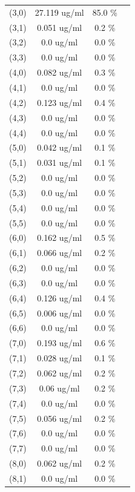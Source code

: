 \documentclass{article}
\begin{document}
\begin{tabular}{c c c c}
(3,0)&        27.119 ug/ml        &85.0 \%\\
(3,1)&        0.051 ug/ml        &0.2 \%\\
(3,2)&        0.0 ug/ml        &0.0 \%\\
(3,3)&        0.0 ug/ml        &0.0 \%\\
(4,0)&        0.082 ug/ml        &0.3 \%\\
(4,1)&        0.0 ug/ml        &0.0 \%\\
(4,2)&        0.123 ug/ml        &0.4 \%\\
(4,3)&        0.0 ug/ml        &0.0 \%\\
(4,4)&        0.0 ug/ml        &0.0 \%\\
(5,0)&        0.042 ug/ml        &0.1 \%\\
(5,1)&        0.031 ug/ml        &0.1 \%\\
(5,2)&        0.0 ug/ml        &0.0 \%\\
(5,3)&        0.0 ug/ml        &0.0 \%\\
(5,4)&        0.0 ug/ml        &0.0 \%\\
(5,5)&        0.0 ug/ml        &0.0 \%\\
(6,0)&        0.162 ug/ml        &0.5 \%\\
(6,1)&        0.066 ug/ml        &0.2 \%\\
(6,2)&        0.0 ug/ml        &0.0 \%\\
(6,3)&        0.0 ug/ml        &0.0 \%\\
(6,4)&        0.126 ug/ml        &0.4 \%\\
(6,5)&        0.006 ug/ml        &0.0 \%\\
(6,6)&        0.0 ug/ml        &0.0 \%\\
(7,0)&        0.193 ug/ml        &0.6 \%\\
(7,1)&        0.028 ug/ml        &0.1 \%\\
(7,2)&        0.062 ug/ml        &0.2 \%\\
(7,3)&        0.06 ug/ml        &0.2 \%\\
(7,4)&        0.0 ug/ml        &0.0 \%\\
(7,5)&        0.056 ug/ml        &0.2 \%\\
(7,6)&        0.0 ug/ml        &0.0 \%\\
(7,7)&        0.0 ug/ml        &0.0 \%\\
(8,0)&        0.062 ug/ml        &0.2 \%\\
(8,1)&        0.0 ug/ml        &0.0 \%\\

\end{tabular}
\end{document}
